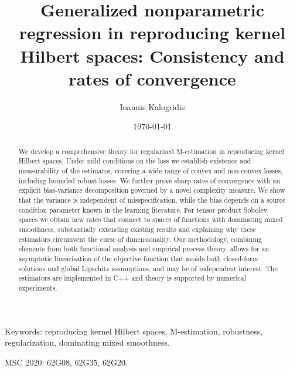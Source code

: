 \documentclass[11pt]{article}
\theoremstyle{definition}
\theoremstyle{remark}
\begin{document}

\title{Generalized nonparametric regression in reproducing kernel Hilbert spaces: Consistency and rates of convergence}
\author{Ioannis Kalogridis}
\date{\today}
\maketitle
	
\begin{abstract}

We develop a comprehensive theory for regularized M-estimation in reproducing kernel Hilbert spaces. Under mild conditions on the loss we establish existence and measurability of the estimator, covering a wide range of convex and non-convex losses, including bounded robust losses. We further prove sharp rates of convergence with an explicit bias-variance decomposition governed by a novel complexity measure. We show that the variance is independent of misspecification, while the bias depends on a source condition parameter known in the learning literature. For tensor product Sobolev spaces we obtain new rates that connect to spaces of functions with dominating mixed smoothness, substantially extending existing results and explaining why these estimators circumvent the curse of dimensionality. Our methodology, combining elements from  both functional analysis and empirical process theory, allows for an asymptotic linearisation of the objective function that avoids both closed-form solutions and global Lipschitz assumptions, and may be of independent interest. The estimators are implemented in C++ and theory is supported by numerical experiments.

\end{abstract}

{Keywords:}  reproducing kernel Hilbert spaces, M-estimation, robustness, regularization, dominating mixed smoothness.

{MSC 2020}:  62G08, 62G35, 62G20.
\end{document}
